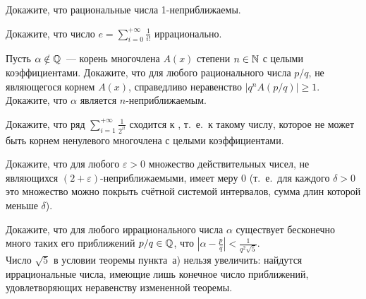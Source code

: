 \documentclass[a4paper, 12pt]{article}
\begin{document}
 Докажите, что рациональные числа 1-неприближаемы.

 Докажите, что число $\displaystyle{e =
\sum\limits^{+\infty}_{i = 0}{\frac1{i!}}}$ иррационально.

 Пусть $\alpha\notin\mathbb{Q}$~--- корень многочлена $A(x)$ степени
$n\in\mathbb{N}$ с целыми коэффициентами.  Докажите, что  для любого
рационального числа $p/q$, не являющегося корнем $A(x)$, справедливо
неравенство $|q^nA(p/q)| \geq 1$.  Докажите, что $\alpha$
является $n$-неприближаемым.

 Докажите, что ряд $\displaystyle{\sum\limits^{+\infty}_{i =
1} {\frac1{2^{i!}}}}$ сходится к ,
т.~е.~к такому числу, которое не может быть корнем ненулевого
многочлена с целыми коэффициентами.

 Докажите, что для любого $\varepsilon > 0$ множество
действительных чисел, не являющихся $(2 +
\varepsilon)$-неприближаемыми, имеет меру 0 (т.~е.~для каждого
$\delta > 0$ это множество можно покрыть счётной системой
интервалов, сумма длин которой меньше $\delta$).

   Докажите, что
для любого иррационального числа $\alpha$ существует бесконечно
много таких его приближений $p/q\in\mathbb{Q}$, что
$\displaystyle{\left|\alpha - {\frac pq}\right| < {\frac1{q^2\sqrt 5}}}$.\\
 Число $\sqrt 5$ в условии теоремы пункта~а) нельзя увеличить:
найдутся иррациональные числа, имеющие лишь конечное число
приближений, удовлетворяющих неравенству измененной теоремы.



\end{document}
